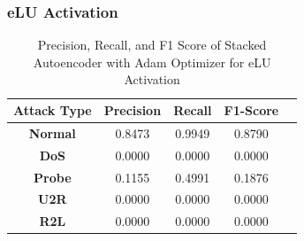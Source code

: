 \documentclass[12pt, a4paper]{report}
\begin{document}
\subsubsection{eLU Activation}
\begin{table}[ht]
\centering
\captionsetup{justification=centering,margin=2cm}
\begin{tabular}{|c|c|c|c|c|}
\hline
\multicolumn{1}{|c|}{\textbf{Attack Type}} & \multicolumn{1}{c|}{\textbf{Precision}} & \multicolumn{1}{c|}{\textbf{Recall}} & \multicolumn{1}{c|}{\textbf{F1-Score}} \\ \hline
\textbf{Normal}        & 0.8473                                   & 0.9949                                & 0.8790                                                                  \\ \hline
\textbf{DoS}           & 0.0000                                  & 0.0000                                &  0.0000                                                                    \\ \hline
\textbf{Probe}         & 0.1155                                  & 0.4991                                & 0.1876                                                                  \\ \hline
\textbf{U2R}           & 0.0000                                    & 0.0000                                & 0.0000                                                                   \\ \hline
\textbf{R2L}           & 0.0000                                      & 0.0000                                   & 0.0000                                                            \\ \hline         \end{tabular}
\caption{Precision, Recall, and F1 Score of Stacked Autoencoder with Adam Optimizer for eLU Activation}
\label{prf1_adam_elu_auto}
\end{table}
\end{document}
